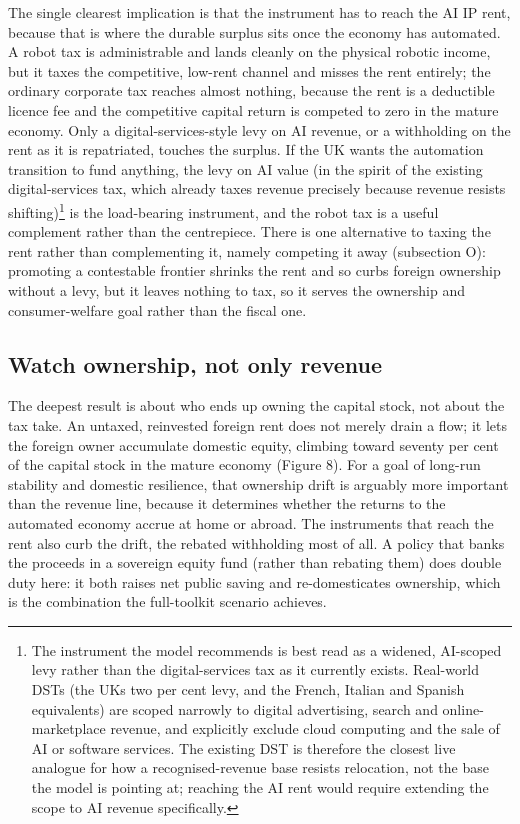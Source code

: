 \documentclass[12pt]{article}
\begin{document}
The single clearest implication is that the instrument has to reach the
AI IP rent, because that is where the durable surplus sits once the
economy has automated. A robot tax is administrable and lands cleanly on
the physical robotic income, but it taxes the competitive, low-rent
channel and misses the rent entirely; the ordinary corporate tax reaches
almost nothing, because the rent is a deductible licence fee and the
competitive capital return is competed to zero in the mature economy.
Only a digital-services-style levy on AI revenue, or a withholding on
the rent as it is repatriated, touches the surplus. If the UK wants the
automation transition to fund anything, the levy on AI value (in the
spirit of the existing digital-services tax, which already taxes revenue
precisely because revenue resists shifting)\footnote{The instrument the
model recommends is best read as a widened, AI-scoped levy rather than
the digital-services tax as it currently exists. Real-world DSTs (the
UK\textquotesingle s two per cent levy, and the French, Italian and
Spanish equivalents) are scoped narrowly to digital advertising, search
and online-marketplace revenue, and explicitly exclude cloud computing
and the sale of AI or software services. The existing DST is therefore
the closest live analogue for how a recognised-revenue base resists
relocation, not the base the model is pointing at; reaching the AI rent
would require extending the scope to AI revenue specifically.} is the
load-bearing instrument, and the robot tax is a useful complement rather than the
centrepiece. There is one alternative to taxing the rent rather than
complementing it, namely competing it away (subsection O): promoting a
contestable frontier shrinks the rent and so curbs foreign ownership
without a levy, but it leaves nothing to tax, so it serves the ownership
and consumer-welfare goal rather than the fiscal one.

\hypertarget{watch-ownership-not-only-revenue}{%
\subsection{Watch ownership, not only
revenue}\label{watch-ownership-not-only-revenue}}

The deepest result is about who ends up owning the capital stock, not
about the tax take. An untaxed, reinvested foreign rent does not merely
drain a flow; it lets the foreign owner accumulate domestic equity,
climbing toward seventy per cent of the capital stock in the mature
economy (Figure 8). For a goal of long-run stability and domestic
resilience, that ownership drift is arguably more important than the
revenue line, because it determines whether the returns to the automated
economy accrue at home or abroad. The instruments that reach the rent
also curb the drift, the rebated withholding most of all. A policy that
banks the proceeds in a sovereign equity fund (rather than rebating
them) does double duty here: it both raises net public saving and
re-domesticates ownership, which is the combination the full-toolkit
scenario achieves.
\end{document}
